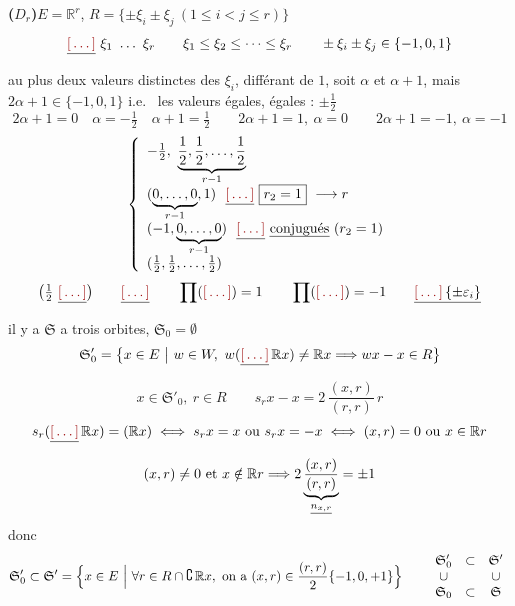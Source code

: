 \documentclass[11pt,a4paper]{article}
\begin{document}
\textbf{($D_r$)}\quad $E=\mathbb{R}^r$,\quad
$R=\lbrace\pm\xi_i\pm\xi_j\ (1\leq i<j\leq r)\rbrace$
\[
  \struck{\ill{}}\ \xi_1\ \ldots\ \xi_r\qquad
  \xi_1\leq\xi_2\leq\cdots\leq\xi_r\qquad
  \pm\xi_i\pm\xi_j\in\lbrace-1,0,1\rbrace
\]
au plus deux valeurs distinctes des $\xi_i$, différant de $1$, soit
$\alpha$ et $\alpha+1$, mais \struck{$\alpha+$} $2\alpha+1\in\lbrace-1,0,1
\rbrace$ i.e.\ \ill{} \ill{} les valeurs égales, égales : $\pm\frac12$
\[
  2\alpha+1=0\quad\alpha=-\tfrac12\quad\alpha+1=\tfrac12\qquad
  2\alpha+1=1,\ \alpha=0\qquad 2\alpha+1=-1,\ \alpha=-1
\]
\[
  \left\lbrace
  \begin{array}{l}
    -\frac12,\ \underbrace{\frac12,\frac12,\ldots,\frac12}_{r-1}\\[4pt]
    (\underbrace{0,\ldots,0}_{r-1},1)\ \ \struck{\ill{}}\
      \boxed{r_2=1}\ \longrightarrow r\\[4pt]
    (-1,\underbrace{0,\ldots,0}_{r-1})\ \ \struck{\ill{}}\
      \text{\uncertain{conjugués}}\ (r_2=1)\\[4pt]
    (\frac12,\frac12,\ldots,\frac12)
  \end{array}\right.
\]
\[
  \bigl(\tfrac12\ \struck{\ill{}}\bigr)\qquad \struck{\ill{}}\qquad
  \prod(\ill{})=1\qquad \prod(\ill{})=-1\qquad
  \struck{\ill{}\,\lbrace\pm\varepsilon_i\rbrace}
\]
il y a \ill{}\quad $\mathfrak{S}$ a trois orbites,\quad
$\mathfrak{S}_0=\emptyset$\ \struck{\ill{}}
\page{97}
\[
  \mathfrak{S}'_0=\bigl\lbrace x\in E\ \big|\ w\in W,\
  w(\struck{\ill{}}\,\mathbb{R}x)\neq\mathbb{R}x\Longrightarrow
  wx-x\in R\bigr\rbrace
\]
\[
  x\in\mathfrak{S}'_0,\ r\in R\qquad
  s_rx-x=2\,\frac{(x,r)}{(r,r)}\,r
\]
\[
  s_r(\struck{\ill{}}\,\mathbb{R}x)=(\mathbb{R}x)\iff
  s_rx=x\ \text{ou}\ s_rx=-x\iff(x,r)=0\ \text{ou}\ x\in\mathbb{R}r
\]
\[
  (x,r)\neq0\ \text{et}\ x\notin\mathbb{R}r\Longrightarrow
  2\underbrace{\frac{(x,r)}{(r,r)}}_{\uncertain{n_{x,r}}}=\pm1
\]
\struck{$(x,r)$} donc
\[
  \mathfrak{S}'_0\subset\mathfrak{S}'=\Bigl\lbrace x\in E\ \Big|\
  \forall r\in R\cap\complement\,\mathbb{R}x,\ \text{on a}\
  (x,r)\in\frac{(r,r)}{2}\lbrace-1,0,+1\rbrace\Bigr\rbrace
  \qquad
  \begin{array}{ccc}
    \mathfrak{S}'_0&\subset&\mathfrak{S}'\\
    \cup&&\cup\\
    \mathfrak{S}_0&\subset&\mathfrak{S}
  \end{array}
\]
\end{document}

